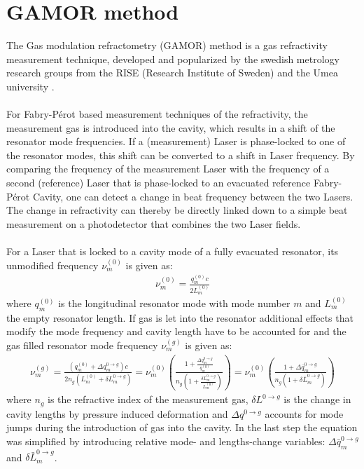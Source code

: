 \section{GAMOR method}
The Gas modulation refractometry (GAMOR) method is a gas refractivity measurement technique, developed and popularized by the swedish metrology research groups from the RISE (Research Institute of Sweden) and the Umea university \cite{Axner-2021}. \\\\
For Fabry-Pérot based measurement techniques of the refractivity, the  measurement gas is introduced into the cavity, which results in a shift of the resonator mode frequencies. If a (measurement) Laser is phase-locked to one of the resonator modes, this shift can be converted to a shift in Laser frequency. By comparing the frequency of the measurement Laser with the frequency of a second (reference) Laser that is phase-locked to an evacuated reference Fabry-Pérot Cavity, one can detect a change in beat frequency between the two Lasers. The change in refractivity can thereby be directly linked down to a simple beat measurement on a photodetector that combines the two Laser fields.\\\\
For a Laser that is locked to a cavity mode of a fully evacuated resonator, its unmodified frequency $\nu_m^{(0)}$ is given as:
\begin{align}
	\nu_m^{(0)}= \frac{q_m^{(0)}c}{2L_m^{(0)}}
\end{align}
where $q_m^{(0)}$ is the longitudinal resonator mode with mode number $m$ and $L_m^{(0)}$ the empty resonator length. If gas is let into the resonator additional effects that modify the mode frequency and cavity length have to be accounted for and the gas filled resonator mode frequency $\nu_m^{(g)}$ is given as:
\begin{align}
	\nu_m^{(g)}= \frac{\left( q_m^{(0)} +\Delta q_m^{0\rightarrow g} \right) c}{2 n_g\left( L_m^{(0)} + \delta L_m^{0\rightarrow g} \right)} 
	= \nu_m^{(0)} \left( \frac{1+\frac{\Delta q_m^{0\rightarrow g} }{ q_m^{(0)}}}{n_g\left(1+ \frac{\delta L_m^{0\rightarrow g}}{L_m^{(0)}} \right)}\right)
	= \nu_m^{(0)} \left( \frac{1+\Delta \bar{q}_m^{0\rightarrow g} }{n_g\left(1+ \delta \bar{L}_m^{0\rightarrow g} \right)}\right)
\end{align}
where $n_g$ is the refractive index of the measurement gas, $\delta L^{0\rightarrow g}$ is the change in cavity lengths by pressure induced deformation and $\Delta q^{0\rightarrow g} $ accounts for mode jumps during the introduction of gas into the cavity. In the last step the equation was simplified by introducing relative mode- and lengths-change variables: $\Delta \bar{q}_m^{0\rightarrow g}$ and $\delta\bar{L}_m^{0\rightarrow g}$.\\\\
